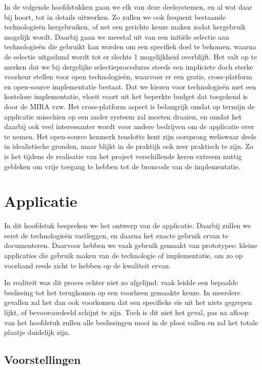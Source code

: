 In de volgende hoofdstukken gaan we elk van deze deelsystemen, en al wat daar bij hoort, tot in details uitwerken. Zo zullen we ook frequent bestaande technologieën hergebruiken, of net een gerichte keuze maken zodat hergebruik mogelijk wordt. Daarbij gaan we meestal uit van een initiële selectie aan technologieën die gebruikt kan worden om een specifiek doel te bekomen, waarna de selectie uitgedund wordt tot er slechts 1 mogelijkheid overblijft. Het valt op te merken dat we bij dergelijke selectieprocedures steeds een impliciete doch sterke voorkeur stellen voor open technologieën, waarvoor er een gratis, cross-platform en open-source implementatie bestaat. Dat we kiezen voor technologieën met een kosteloze implementatie, vloeit voort uit het beperkte budget dat toegekend is door de MIRA vzw. Het cross-platform aspect is belangrijk omdat op termijn de applicatie misschien op een ander systeem zal moeten draaien, en omdat het daarbij ook veel interessanter wordt voor andere bedrijven om de applicatie over te nemen. Het open-source kenmerk tenslotte kent zijn oorsprong weliswaar deels in idealistische gronden, maar blijkt in de praktijk ook zeer praktisch te zijn. Zo is het tijdens de realisatie van het project verschillende keren extreem nuttig gebleken om vrije toegang te hebben tot de broncode van de implementatie.


%
%

\chapter{Applicatie}
\label{ontwerp:applicatie}

In dit hoofdstuk bespreken we het ontwerp van de applicatie. Daarbij zullen we eerst de technologieën vastleggen, en daarna het exacte gebruik ervan te documenteren. Daarvoor hebben we vaak gebruik gemaakt van prototypes: kleine applicaties die gebruik maken van de technologie of implementatie, om zo op voorhand reeds zicht te hebben op de kwaliteit ervan.

In realiteit was dit proces echter niet zo afgelijnd: vaak leidde een bepaalde beslissing tot het terugkomen op een voorheen gemaakte keuze. In meerdere gevallen zal het dan ook voorkomen dat een specifieke eis uit het niets gegrepen lijkt, of bevooroordeeld schijnt te zijn. Toch is dit niet het geval, pas na afloop van het hoofdstuk zullen alle beslissingen mooi in de plooi vallen en zal het totale plaatje duidelijk zijn.

\section{Voorstellingen}
\label{ontwerp:applicatie:voorstellingen}

